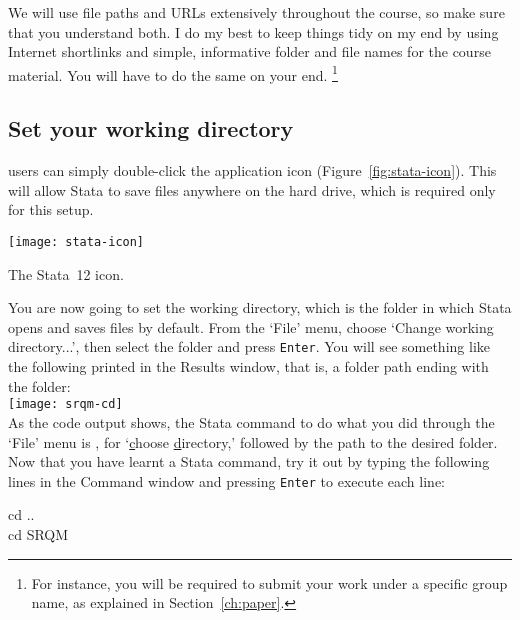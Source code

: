 	We will use file paths and URLs extensively throughout the course, so make sure that you understand both. I do my best to keep things tidy on my end by using Internet shortlinks and simple, informative folder and file names for the course material. You will have to do the same on your end.%
		\footnote{For instance, you will be required to submit your work under a specific group name, as explained in Section~\ref{ch:paper}.}%

	\subsection{Set your working directory}%
		\label{sec:working-directory}%

   \OSX users can simply double-click the application icon (Figure~\ref{fig:stata-icon}).  This will allow Stata to save files anywhere on the hard drive, which is required only for this setup.%

		\begin{marginfigure}
			\texttt{[image: stata-icon]}
			\caption{The Stata~12 icon.}
			\label{fig:stata-icon}
	  \end{marginfigure}
	 
	You are now going to set the working directory, which is the folder in which Stata opens and saves files by default. From the `File' menu, choose `Change working directory...', then select the \SRQM folder and press \texttt{Enter}. You will see something like the following printed in the Results window, that is, a folder path ending with the \SRQM folder:\\[1em]%
	
		\texttt{[image: srqm-cd]}\\[1em]

	As the code output shows, the Stata command to do what you did through the `File' menu is , for `\underline{c}hoose \underline{d}irectory,' followed by the path to the desired folder. Now that you have learnt a Stata command, try it out by typing the following lines in the Command window and pressing \texttt{Enter} to execute each line:%
	
	\begin{docspec}
		cd ..\\
		cd SRQM
	\end{docspec}
	

